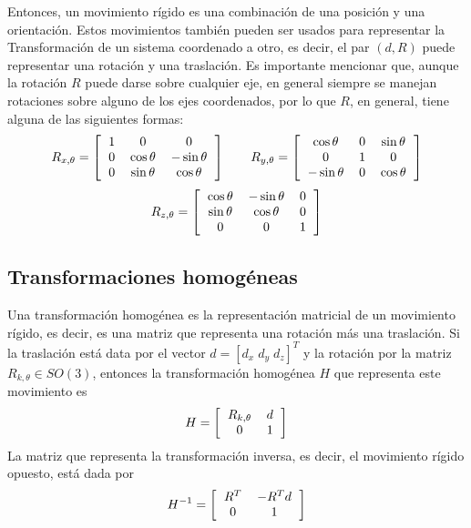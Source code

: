 \documentclass[letterpaper,12pt]{article}
\begin{document}
Entonces, un movimiento rígido es una combinación de una posición y una orientación. Estos movimientos también pueden ser usados para representar la Transformación de un sistema coordenado a otro, es decir, el par $(d, R)$ puede representar una rotación y una traslación. Es importante mencionar que, aunque la rotación $R$ puede darse sobre cualquier eje, en general siempre se manejan rotaciones sobre alguno de los ejes coordenados, por lo que $R$, en general, tiene alguna de las siguientes formas:
\[R_{x,\theta} = \left[
    \begin{tabular}{ccc}
      1 & 0 & 0\\
      0 & $\cos \theta$ & $-\sin \theta$\\
      0 & $\sin \theta$ & $\cos \theta$
    \end{tabular}
  \right]\qquad
  R_{y,\theta} = \left[
    \begin{tabular}{ccc}
      $\cos\theta$ & 0 & $\sin\theta$\\
      0 & 1 & 0\\
      $-\sin\theta$ & 0 & $\cos\theta$
    \end{tabular}
  \right]
\]
\[R_{z,\theta} = \left[
    \begin{tabular}{ccc}
      $\cos \theta$ & $-\sin \theta$ & 0\\
      $\sin \theta$ & $\cos \theta$  & 0\\
      0 & 0 & 1
    \end{tabular}
  \right]\]

\subsection{Transformaciones homogéneas}
Una transformación homogénea es la representación matricial de un movimiento rígido, es decir, es una matriz que representa una rotación más una traslación. Si la traslación está data por el vector $d=[d_x\;d_y\;d_z]^T$ y la rotación por la matriz $R_{k,\theta}\in SO(3)$, entonces la transformación homogénea $H$ que representa este movimiento es
\[H = \left[\begin{tabular}{cc}
    $R_{k,\theta}$ & $d$\\
    0 & 1
  \end{tabular}\right]\]
La matriz que representa la transformación inversa, es decir, el movimiento rígido opuesto, está dada por
\[H^{-1} = \left[\begin{tabular}{cc}
    $R^T$ & $-R^Td$\\
    0 & 1
  \end{tabular}\right]\]
\end{document}
